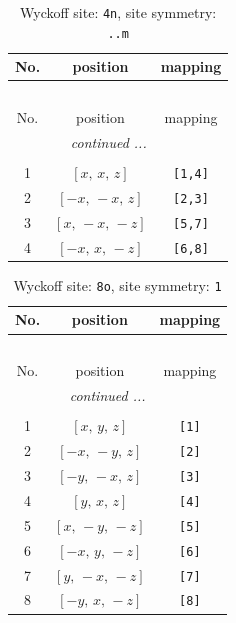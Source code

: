 \documentclass[fleqn,8pt]{jsarticle}
\begin{document}
\renewcommand{\arraystretch}{1.2}
\begin{longtable}{ccc}
\caption{Wyckoff site: {\tt 4n}, site symmetry: {\tt ..m}}
 \\
 \hline \hline
No. & position & mapping \\ \hline \endfirsthead

\multicolumn{2}{l}{\tablename\ \thetable{}} \\
 \hline \hline
No. & position & mapping \\ \hline \endhead

 \hline \hline
\multicolumn{2}{r}{\footnotesize\it continued ...} \\ \endfoot

 \hline \hline
\multicolumn{2}{r}{} \\ \endlastfoot

1 & $\left[ x,\, x,\, z \right]$ & {\tt [1,4]} \\ \hline
2 & $\left[ - x,\, - x,\, z \right]$ & {\tt [2,3]} \\ \hline
3 & $\left[ x,\, - x,\, - z \right]$ & {\tt [5,7]} \\ \hline
4 & $\left[ - x,\, x,\, - z \right]$ & {\tt [6,8]} \\
\end{longtable}
\renewcommand{\arraystretch}{1.2}
\begin{longtable}{ccc}
\caption{Wyckoff site: {\tt 8o}, site symmetry: {\tt 1}}
 \\
 \hline \hline
No. & position & mapping \\ \hline \endfirsthead

\multicolumn{2}{l}{\tablename\ \thetable{}} \\
 \hline \hline
No. & position & mapping \\ \hline \endhead

 \hline \hline
\multicolumn{2}{r}{\footnotesize\it continued ...} \\ \endfoot

 \hline \hline
\multicolumn{2}{r}{} \\ \endlastfoot

1 & $\left[ x,\, y,\, z \right]$ & {\tt [1]} \\ \hline
2 & $\left[ - x,\, - y,\, z \right]$ & {\tt [2]} \\ \hline
3 & $\left[ - y,\, - x,\, z \right]$ & {\tt [3]} \\ \hline
4 & $\left[ y,\, x,\, z \right]$ & {\tt [4]} \\ \hline
5 & $\left[ x,\, - y,\, - z \right]$ & {\tt [5]} \\ \hline
6 & $\left[ - x,\, y,\, - z \right]$ & {\tt [6]} \\ \hline
7 & $\left[ y,\, - x,\, - z \right]$ & {\tt [7]} \\ \hline
8 & $\left[ - y,\, x,\, - z \right]$ & {\tt [8]} \\
\end{longtable}
\end{document}

